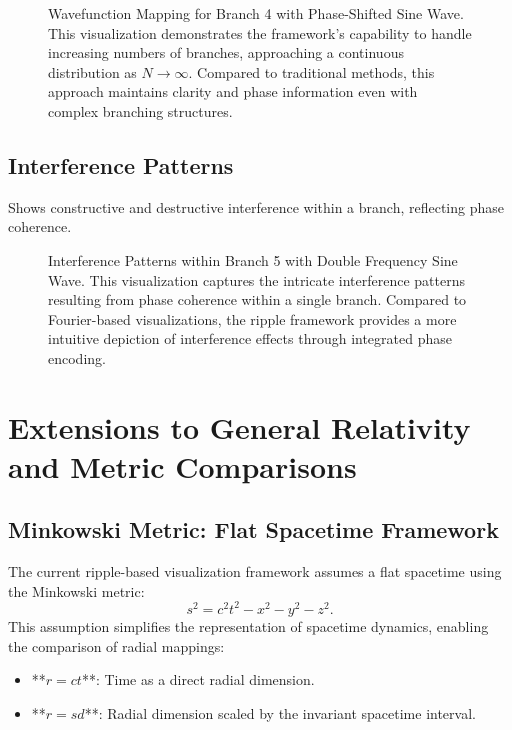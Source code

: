 \documentclass[12pt]{article}
\begin{document}
\begin{figure}[h!]
    \centering
    \caption{Wavefunction Mapping for Branch 4 with Phase-Shifted Sine Wave. This visualization demonstrates the framework's capability to handle increasing numbers of branches, approaching a continuous distribution as \(N \rightarrow \infty\). Compared to traditional methods, this approach maintains clarity and phase information even with complex branching structures.}
    \label{fig:sine_wavefunction}
\end{figure}

\subsection{Interference Patterns}
Shows constructive and destructive interference within a branch, reflecting phase coherence.

\begin{figure}[h!]
    \centering
    \caption{Interference Patterns within Branch 5 with Double Frequency Sine Wave. This visualization captures the intricate interference patterns resulting from phase coherence within a single branch. Compared to Fourier-based visualizations, the ripple framework provides a more intuitive depiction of interference effects through integrated phase encoding.}
    \label{fig:interference_patterns}
\end{figure}






\section{Extensions to General Relativity and Metric Comparisons}
\label{appendix:C}

\subsection{Minkowski Metric: Flat Spacetime Framework}
The current ripple-based visualization framework assumes a flat spacetime using the Minkowski metric:
\[
s^2 = c^2 t^2 - x^2 - y^2 - z^2.
\]
This assumption simplifies the representation of spacetime dynamics, enabling the comparison of radial mappings:
\begin{itemize}
    \item **\(r = ct\)**: Time as a direct radial dimension.
    \item **\(r = sd\)**: Radial dimension scaled by the invariant spacetime interval.
\end{itemize}
\end{document}
